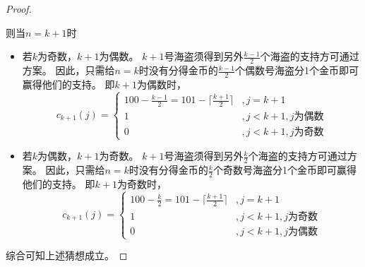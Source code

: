 \documentclass[answers]{exam}
\begin{document}
\begin{questions}
\begin{solution}
\begin{proof}
\begin{enumerate}
{                      则当$n=k+1$时
                      \begin{itemize}
                          \item {
                                若$k$为奇数，$k+1$为偶数。
                                $k+1$号海盗须得到另外$\frac{k-1}{2}$个海盗的支持方可通过方案。
                                因此，只需给$n=k$时没有分得金币的$\frac{k-1}{2}$个偶数号海盗分1个金币即可赢得他们的支持。
                                即$k+1$为偶数时，$$
                                    c_{k+1}(j) = \begin{cases}
                                        100 - \frac{k-1}{2} = 101 - \lceil \frac{k+1}{2} \rceil & , j=k+1                  \\
                                        1                                                       & , j<k+1, j \text{为偶数} \\
                                        0                                                       & , j<k+1, j \text{为奇数}
                                    \end{cases}
                                $$
                                }
                          \item {
                                若$k$为偶数，$k+1$为奇数。
                                $k+1$号海盗须得到另外$\frac{k}{2}$个海盗的支持方可通过方案。
                                因此，只需给$n=k$时没有分得金币的$\frac{k}{2}$个奇数号海盗分1个金币即可赢得他们的支持。
                                即$k+1$为奇数时，$$
                                    c_{k+1}(j) = \begin{cases}
                                        100 - \frac{k}{2} = 101 - \lceil \frac{k+1}{2} \rceil & , j=k+1                  \\
                                        1                                                     & , j<k+1, j \text{为奇数} \\
                                        0                                                     & , j<k+1, j \text{为偶数}
                                    \end{cases}
                                $$
                                }
                      \end{itemize}
                      }
            \end{enumerate}
            综合可知上述猜想成立。
        \end{proof}


\end{solution}
\end{questions}
\end{document}
